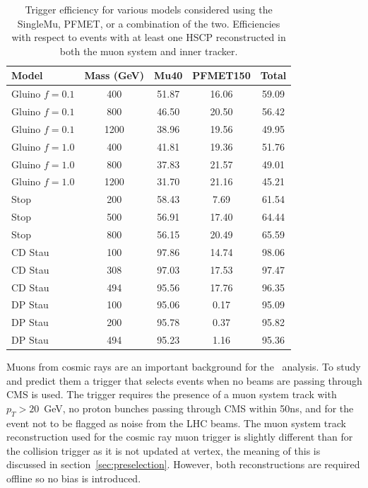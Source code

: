 \begin{table}
 \begin{center}
      \caption[Trigger efficiency for various models considered with respect to events with a reconstructed HSCP in both the muon system and inner tracker]
{Trigger efficiency for various models considered using the SingleMu, PFMET, or a combination of the two.
Efficiencies with respect to events with at least one HSCP reconstructed in both the muon system and inner tracker.}
     \label{tab:triggEffGl}
  \begin{tabular}{|l|c|c|c|c|} \hline
      Model     & Mass (GeV) & Mu40       & PFMET150   & Total                 \\ \hline
 Gluino $f=0.1$ &  400  & 51.87      & 16.06      & 59.09    \\
 Gluino $f=0.1$ &  800  & 46.50      & 20.50      & 56.42    \\
 Gluino $f=0.1$ & 1200  & 38.96      & 19.56      & 49.95    \\
 Gluino $f=1.0$ &  400  & 41.81      & 19.36      & 51.76    \\
 Gluino $f=1.0$ &  800  & 37.83      & 21.57      & 49.01    \\
 Gluino $f=1.0$ & 1200  & 31.70      & 21.16      & 45.21    \\
           Stop &  200  & 58.43      &  7.69      & 61.54    \\
           Stop &  500  & 56.91      & 17.40      & 64.44    \\
           Stop &  800  & 56.15      & 20.49      & 65.59    \\
      CD Stau &  100  & 97.86      & 14.74      & 98.06    \\
      CD Stau &  308  & 97.03      & 17.53      & 97.47    \\
      CD Stau &  494  & 95.56      & 17.76      & 96.35    \\
        DP Stau &  100  & 95.06      &  0.17      & 95.09    \\
        DP Stau &  200  & 95.78      &  0.37      & 95.82    \\
        DP Stau &  494  & 95.23      &  1.16      & 95.36    \\ \hline
  \end{tabular}
 \end{center}
\end{table}

Muons from cosmic rays are an important background for the \muononly\ analysis. To study and predict them a trigger that selects events when no beams are passing through
CMS is used. The trigger requires the presence of a muon system track with $p_T > 20$~GeV, no proton bunches passing through CMS within 50ns, and for the event not to be flagged as
noise from the LHC beams. The muon system track reconstruction used for the cosmic ray muon trigger is slightly 
different than for the collision trigger as it is not updated at vertex,
the meaning of this is discussed in section~\ref{sec:preselection}. However, both reconstructions are required offline so no bias is introduced.